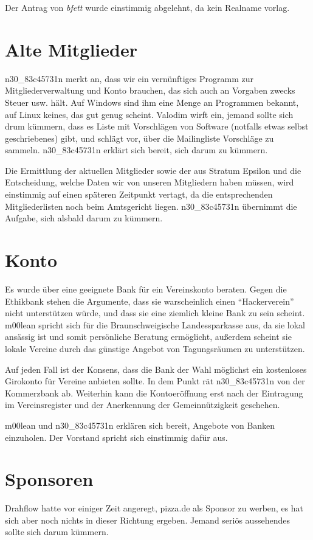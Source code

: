 \documentclass[a4paper,12pt]{scrartcl}
\begin{document}
Der Antrag von \emph{bfett} wurde einstimmig abgelehnt, da kein Realname vorlag.

\section{Alte Mitglieder}
n30\_83c45731n merkt an, dass wir ein vernünftiges Programm zur Mitgliederverwaltung und
Konto brauchen, das sich auch an Vorgaben zwecks Steuer usw. hält. Auf
Windows sind ihm eine Menge an Programmen bekannt, auf Linux keines, das gut
genug scheint. Valodim wirft ein, jemand sollte sich drum kümmern, dass es
Liste mit Vorschlägen von Software (notfalls etwas selbst geschriebenes) gibt,
und schlägt vor, über die Mailingliste Vorschläge zu sammeln. n30\_83c45731n erklärt
sich bereit, sich darum zu kümmern.

Die Ermittlung der aktuellen Mitglieder sowie der aus Stratum Epsilon und die
Entscheidung, welche Daten wir von unseren Mitgliedern haben müssen, wird
einstimmig auf einen späteren Zeitpunkt vertagt, da die entsprechenden
Mitgliederlisten noch beim Amtsgericht liegen. n30\_83c45731n übernimmt die Aufgabe,
sich alsbald darum zu kümmern.

\section{Konto}
Es wurde über eine geeignete Bank für ein Vereinskonto beraten. Gegen die
Ethikbank stehen die Argumente, dass sie warscheinlich einen "`Hackerverein"'
nicht unterstützen würde, und dass sie eine ziemlich kleine Bank zu sein
scheint. m00lean spricht sich für die Braunschweigische Landessparkasse aus, da
sie lokal ansässig ist und somit persönliche Beratung ermöglicht, außerdem
scheint sie lokale Vereine durch das günstige Angebot von Tagungsräumen zu
unterstützen.

Auf jeden Fall ist der Konsens, dass die Bank der Wahl möglichst ein kostenloses
Girokonto für Vereine anbieten sollte. In dem Punkt rät n30\_83c45731n von der
Kommerzbank ab. Weiterhin kann die Kontoeröffnung erst nach der Eintragung im
Vereinsregister und der Anerkennung der Gemeinnützigkeit geschehen.

m00lean und n30\_83c45731n erklären sich bereit, Angebote von Banken einzuholen. Der
Vorstand spricht sich einstimmig dafür aus.

\section{Sponsoren}
Drahflow hatte vor einiger Zeit angeregt, pizza.de als Sponsor zu werben,
es hat sich aber noch nichts in dieser Richtung ergeben. Jemand seriös
aussehendes sollte sich darum kümmern.
\end{document}
